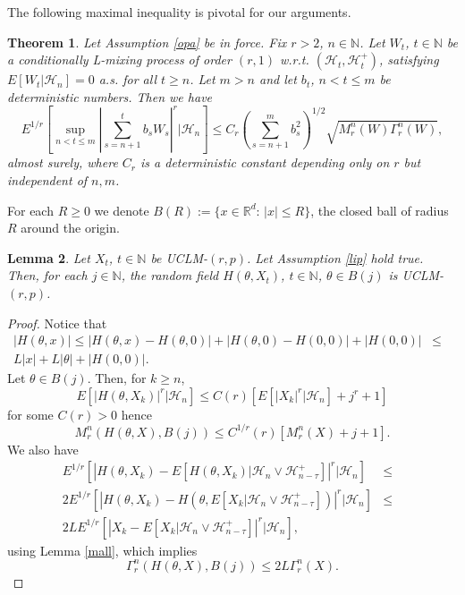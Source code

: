 \documentclass[a4paper,draft]{article}
\newtheorem{theorem}{Theorem}[section]
\newtheorem{lemma}[theorem]{Lemma}
\begin{document}
The following maximal inequality is pivotal for our arguments.

\begin{theorem}\label{estim} Let Assumption \ref{opa} be in force.
Fix $r>2$, $n\in \mathbb{N}$. 
Let $W_t$, $t\in\mathbb{N}$ be a conditionally L-mixing process of order 
$(r,1)$ w.r.t. $(\mathcal{H}_t,\mathcal{H}_t^+)$, satisfying 
$E[W_t\vert\mathcal{H}_n]=0$ a.s. for all {$t\geq n$}. 
Let $m >n$ and let $b_t$, $n< t\leq m$ be deterministic numbers. Then we have
\begin{equation}\label{mandrill}
E^{1/r}\left[ \sup_{n < t \le m} \left| \sum_{s = n+1}^{t} b_s W_s \right|^r \big\vert\mathcal{H}_n \right]
 \le C_r \left( \sum_{s=n+1}^{m} b_s^2 \right)^{1/2} \sqrt{{M}_r^{n}(W) \Gamma_r^{n}(W)},
\end{equation}
almost surely, where $C_r$ is a deterministic constant depending only on $r$ but independent of $n,m$.
\end{theorem}

For each $R\geq 0$
we denote $B(R):=\{x\in\mathbb{R}^d:\, |x|\leq R\}$, the closed
ball of radius $R$ around the origin. 

\begin{lemma}\label{below} Let $X_t$, $t\in\mathbb{N}$ be UCLM-$(r,p)$. Let Assumption \ref{lip} hold true. Then,
for each $j\in\mathbb{N}$, the random field $H(\theta,X_t)$,
$t\in\mathbb{N}$, $\theta\in B(j)$ is UCLM-$(r,p)$.
\end{lemma}
\begin{proof} Notice that 
\begin{eqnarray*}
|H(\theta,x)|\leq |H(\theta,x)-H(\theta,0)|+
|H(\theta,0)-H(0,0)|+ |H(0,0)| &\leq&\\
L|x| + L|\theta|+|H(0,0)|.
\end{eqnarray*}
Let $\theta\in B(j)$. Then, for $k\geq n$,
$$
E[|H(\theta,X_k)|^r\vert\mathcal{H}_n]\leq 
C(r)[E[|X_k|^r\vert\mathcal{H}_n]+j^r+1]
$$
for some $C(r)>0$ hence
$$
M^n_r(H(\theta,X),B(j))\leq C^{1/r}(r)[M_r^n(X)+j+1].
$$
We also have
\begin{eqnarray*}
E^{1/r}[|H(\theta,X_k)-E[H(\theta,X_k)\vert\mathcal{H}_n\vee\mathcal{H}_{n-\tau}^+]|^r\vert\mathcal{H}_n] &\leq&\\
2E^{1/r}[|H(\theta,X_k)-H(\theta,E[X_k\vert\mathcal{H}_n\vee\mathcal{H}_{n-\tau}^+])|^r\vert\mathcal{H}_n] &\leq&\\
2L E^{1/r}[|X_k-E[X_k\vert\mathcal{H}_n\vee\mathcal{H}_{n-\tau}^+]|^r 
\vert\mathcal{H}_n], & &
\end{eqnarray*}
using Lemma \ref{mall}, which implies
$$
\Gamma^n_r(H(\theta,X),B(j))\leq 2L\Gamma^n_r(X).
$$
\end{proof}
\end{document}
